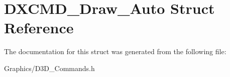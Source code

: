 \hypertarget{structDXCMD__Draw__Auto}{}\section{D\+X\+C\+M\+D\+\_\+\+Draw\+\_\+\+Auto Struct Reference}
\label{structDXCMD__Draw__Auto}


The documentation for this struct was generated from the following file\+:\begin{DoxyCompactItemize}
\item 
Graphics/D3\+D\+\_\+\+Commands.\+h\end{DoxyCompactItemize}
